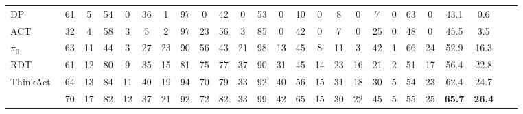\begin{table}[t!]
{\begin{tabular}{l|
        cc|cc|cc|
        cc|cc|cc|
        cc|cc|cc|cc|cccc}
            \midrule
            DP~\cite{chi2023diffusion} & 61 & 5 & 54 & 0 & 36 & 1 & 97 & 0 & 42 & 0 & 53 & 0 & 10 & 0 & 8 & 0 & 7 & 0 & 63 & 0 & 43.1 & 0.6 \\
            ACT~\cite{zhao2023learning} & 32 & 4 & 58 & 3 & 5 & 2 & 97 & 23 & 56 & 3 & 85 & 0 & 42 & 0 & 7 & 0 & 25 & 0 & 48 & 0 & 45.5 & 3.5 \\
            $\pi_0$~\cite{black2024pi_0} & 63 & 11 & 44 & 3 & 27 & 23 & 90 & 56 & 43 & 21 & 98 & 13 & 45 & 8 & 11 & 3 & 42 & 1 & 66 & 24 & 52.9 & 16.3 \\
            RDT~\cite{liu2024rdt} & 61 & 12 & 80 & 9 & 35 & 15 & 81 & 75 & 77 & 37 & 90 & 31 & 45 & 14 & 23 & 16 & 21 & 2 & 51 & 17 & 56.4 & 22.8 \\
            ThinkAct~\cite{huang2025thinkact} & 64 & 13 & 84 & 11 & 40 & 19 & 94 & 70 & 79 & 33 & 92 & 40 & 56 & 15 & 31 & 18 & 30 & 5 & 54 & 23 & 62.4 & 24.7 \\
            \midrule
            \textbf{\ours{}} & 70 & 17 & 82 & 12 & 37 & 21 & 92 & 72 & 82 & 33 & 99 & 42 & 65 & 15 & 30 & 22 & 45 & 5 & 55 & 25 & \textbf{65.7} & \textbf{26.4} \\
            \bottomrule
        \end{tabular}%
    }
    \label{tab:robotwin}
\end{table}